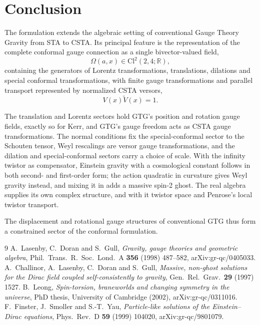\documentclass[11pt,a4paper]{article}
\newcommand{\Cl}{\mathrm{Cl}}
\newcommand{\R}{\mathbb{R}}
\newcommand{\Om}{\Omega}
\newcommand{\rev}[1]{\widetilde{#1}}
\begin{document}
\section{Conclusion}

The formulation extends the algebraic setting of conventional Gauge
Theory Gravity from STA to CSTA. Its principal feature is the
representation of the complete conformal gauge connection as a single
bivector-valued field,
\[
    \boxed{
        \Om(a,x)\in\Cl^2(2,4;\R),
    }
\]
containing the generators of Lorentz transformations, translations,
dilations and special conformal transformations, with finite gauge
transformations and parallel transport represented by normalized CSTA
versors,
\[
    \boxed{
        V(x)\rev{V}(x)=1.
    }
\]

The translation and Lorentz sectors hold GTG's position and rotation
gauge fields, exactly so for Kerr, and GTG's gauge freedom acts as
CSTA gauge transformations. The normal conditions fix the
special-conformal sector to the Schouten tensor, Weyl rescalings are
versor gauge transformations, and the dilation and special-conformal
sectors carry a choice of scale. With the infinity twistor as
compensator, Einstein gravity with a cosmological constant follows in
both second- and first-order form; the action quadratic in curvature
gives Weyl gravity instead, and mixing it in adds a massive spin-2
ghost. The real algebra supplies its own complex structure, and with
it twistor space and Penrose's local twistor transport.

The displacement and rotational gauge structures of conventional GTG
thus form a constrained sector of the conformal formulation.

\begin{thebibliography}{9}
 A.~Lasenby, C.~Doran and S.~Gull, \emph{Gravity, gauge
theories and geometric algebra}, Phil.\ Trans.\ R.\ Soc.\ Lond.\ A
\textbf{356} (1998) 487--582, arXiv:gr-qc/0405033.
 A.~Challinor, A.~Lasenby, C.~Doran and S.~Gull,
\emph{Massive, non-ghost solutions for the Dirac field coupled
self-consistently to gravity}, Gen.\ Rel.\ Grav.\ \textbf{29} (1997)
1527.
 B.~Leong, \emph{Spin-torsion, braneworlds and changing
symmetry in the universe}, PhD thesis, University of Cambridge (2002),
arXiv:gr-qc/0311016.
 F.~Finster, J.~Smoller and S.-T.~Yau, \emph{Particle-like
solutions of the Einstein--Dirac equations}, Phys.\ Rev.\ D
\textbf{59} (1999) 104020, arXiv:gr-qc/9801079.
\end{thebibliography}
\end{document}
